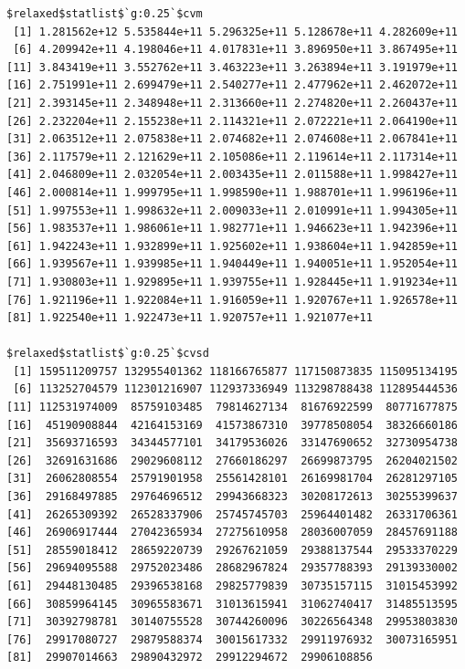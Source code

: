 \documentclass[
]{article}
\begin{document}
\begin{verbatim}
$relaxed$statlist$`g:0.25`$cvm
 [1] 1.281562e+12 5.535844e+11 5.296325e+11 5.128678e+11 4.282609e+11
 [6] 4.209942e+11 4.198046e+11 4.017831e+11 3.896950e+11 3.867495e+11
[11] 3.843419e+11 3.552762e+11 3.463223e+11 3.263894e+11 3.191979e+11
[16] 2.751991e+11 2.699479e+11 2.540277e+11 2.477962e+11 2.462072e+11
[21] 2.393145e+11 2.348948e+11 2.313660e+11 2.274820e+11 2.260437e+11
[26] 2.232204e+11 2.155238e+11 2.114321e+11 2.072221e+11 2.064190e+11
[31] 2.063512e+11 2.075838e+11 2.074682e+11 2.074608e+11 2.067841e+11
[36] 2.117579e+11 2.121629e+11 2.105086e+11 2.119614e+11 2.117314e+11
[41] 2.046809e+11 2.032054e+11 2.003435e+11 2.011588e+11 1.998427e+11
[46] 2.000814e+11 1.999795e+11 1.998590e+11 1.988701e+11 1.996196e+11
[51] 1.997553e+11 1.998632e+11 2.009033e+11 2.010991e+11 1.994305e+11
[56] 1.983537e+11 1.986061e+11 1.982771e+11 1.946623e+11 1.942396e+11
[61] 1.942243e+11 1.932899e+11 1.925602e+11 1.938604e+11 1.942859e+11
[66] 1.939567e+11 1.939985e+11 1.940449e+11 1.940051e+11 1.952054e+11
[71] 1.930803e+11 1.929895e+11 1.939755e+11 1.928445e+11 1.919234e+11
[76] 1.921196e+11 1.922084e+11 1.916059e+11 1.920767e+11 1.926578e+11
[81] 1.922540e+11 1.922473e+11 1.920757e+11 1.921077e+11

$relaxed$statlist$`g:0.25`$cvsd
 [1] 159511209757 132955401362 118166765877 117150873835 115095134195
 [6] 113252704579 112301216907 112937336949 113298788438 112895444536
[11] 112531974009  85759103485  79814627134  81676922599  80771677875
[16]  45190908844  42164153169  41573867310  39778508054  38326660186
[21]  35693716593  34344577101  34179536026  33147690652  32730954738
[26]  32691631686  29029608112  27660186297  26699873795  26204021502
[31]  26062808554  25791901958  25561428101  26169981704  26281297105
[36]  29168497885  29764696512  29943668323  30208172613  30255399637
[41]  26265309392  26528337906  25745745703  25964401482  26331706361
[46]  26906917444  27042365934  27275610958  28036007059  28457691188
[51]  28559018412  28659220739  29267621059  29388137544  29533370229
[56]  29694095588  29752023486  28682967824  29357788393  29139330002
[61]  29448130485  29396538168  29825779839  30735157115  31015453992
[66]  30859964145  30965583671  31013615941  31062740417  31485513595
[71]  30392798781  30140755528  30744260096  30226564348  29953803830
[76]  29917080727  29879588374  30015617332  29911976932  30073165951
[81]  29907014663  29890432972  29912294672  29906108856


\end{verbatim}
\end{document}
